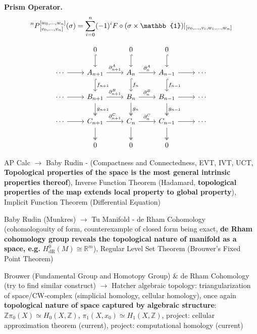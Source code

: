\documentclass[10pt]{article}
\begin{document}
\begin{CJK*}{UTF8}{gbsn}
\textbf{Prism Operator.}
$$\prescript{n}{}{P}_{[v_0,\dots,v_n]}^{[w_0,\dots,w_n]}(\sigma)=\sum_{i=0}^n(-1)^{i} F\circ(\sigma \times \mathbb{1}) |_{\left[v_{0}, \dots, v_{i}, w_{i}, \dots, w_{n}\right]}$$

$$\begin{tikzcd}
                 & 0 \arrow[d, hook]                                                     & 0 \arrow[d, hook]                                         & 0 \arrow[d, hook]                                 &        \\
\cdots \arrow[r] & A_{n+1} \arrow[d, "f_{n+1}", hook] \arrow[r, "\partial_{n+1}^A"]      & A_n \arrow[d, "f_n", hook] \arrow[r, "\partial_n^A"]      & A_{n-1} \arrow[r] \arrow[d, "f_{n-1}", hook]      & \cdots \\
\cdots \arrow[r] & B_{n+1} \arrow[d, "g_{n+1}", two heads] \arrow[r, "\partial_{n+1}^B"] & B_n \arrow[d, "g_n", two heads] \arrow[r, "\partial_n^B"] & B_{n-1} \arrow[r] \arrow[d, "g_{n-1}", two heads] & \cdots \\
\cdots \arrow[r] & C_{n+1} \arrow[d, two heads] \arrow[r, "\partial_{n+1}^C"]            & C_n \arrow[d, two heads] \arrow[r, "\partial_n^C"]        & C_{n-1} \arrow[r] \arrow[d, two heads]            & \cdots \\
                 & 0                                                                     & 0                                                         & 0                                                 &       
\end{tikzcd}$$

\newpage
AP Calc $\to$ Baby Rudin - (Compactness and Connectedness, EVT, IVT, UCT, \textbf{Topological properties of the space is the most general intrinsic properties thereof}), Inverse Function Theorem (Hadamard, \textbf{topological properties of the map extends local property to global property}), Implicit Function Theorem (Differential Equation)

Baby Rudin (Munkres) $\to$ Tu Manifold - de Rham Cohomology (cohomologouity of form, counterexample of closed form being exact, \textbf{de Rham cohomology group reveals the topological nature of manifold as a space, e.g.} $H_{\mathrm{dR}}^{0}(M) \cong \mathbb{R}^{m}$), Regular Level Set Theorem (Brouwer's Fixed Point Theorem)

Brouwer (Fundamental Group and Homotopy Group) \& de Rham Cohomology (try to find similar construct) $\to$ Hatcher algebraic topology: triangularization of space/CW-complex (simplicial homology, cellular homology), once again \textbf{topological nature of space captured by algebraic structure}: $\mathbb{Z} \pi_{0}(X) \simeq H_{0}(X, \mathbb{Z})$, $\pi_1(X,x_0)\simeq H_1(X,\mathbb{Z})$, project: cellular approximation theorem (current), project: computational homology (current)


\end{CJK*}
\end{document}

